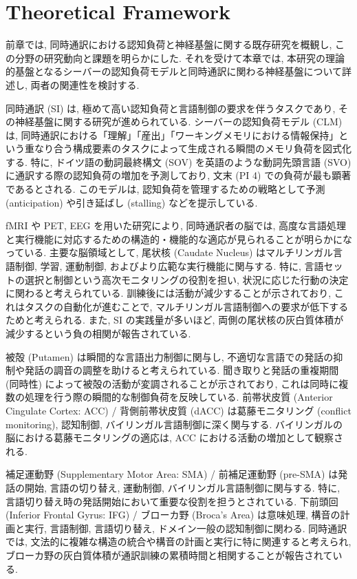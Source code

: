 \section{Theoretical Framework}

前章では, 同時通訳における認知負荷と神経基盤に関する既存研究を概観し, この分野の研究動向と課題を明らかにした.
それを受けて本章では, 本研究の理論的基盤となるシーバーの認知負荷モデルと同時通訳に関わる神経基盤について詳述し, 両者の関連性を検討する.

同時通訳 (SI) は, 極めて高い認知負荷と言語制御の要求を伴うタスクであり, その神経基盤に関する研究が進められている.
シーバーの認知負荷モデル (CLM) は, 同時通訳における「理解」「産出」「ワーキングメモリにおける情報保持」という重なり合う構成要素のタスクによって生成される瞬間のメモリ負荷を図式化する.
特に, ドイツ語の動詞最終構文 (SOV) を英語のような動詞先頭言語 (SVO) に通訳する際の認知負荷の増加を予測しており, 文末 (PI 4) での負荷が最も顕著であるとされる.
このモデルは, 認知負荷を管理するための戦略として予測 (anticipation) や引き延ばし (stalling) などを提示している.

fMRI や PET, EEG を用いた研究により, 同時通訳者の脳では, 高度な言語処理と実行機能に対応するための構造的・機能的な適応が見られることが明らかになっている.
主要な脳領域として, 尾状核 (Caudate Nucleus) はマルチリンガル言語制御, 学習, 運動制御, およびより広範な実行機能に関与する.
特に, 言語セットの選択と制御という高次モニタリングの役割を担い, 状況に応じた行動の決定に関わると考えられている.
訓練後には活動が減少することが示されており, これはタスクの自動化が進むことで, マルチリンガル言語制御への要求が低下するためと考えられる.
また, SI の実践量が多いほど, 両側の尾状核の灰白質体積が減少するという負の相関が報告されている.

被殻 (Putamen) は瞬間的な言語出力制御に関与し, 不適切な言語での発話の抑制や発話の調音の調整を助けると考えられている.
聞き取りと発話の重複期間 (同時性) によって被殻の活動が変調されることが示されており, これは同時に複数の処理を行う際の瞬間的な制御負荷を反映している.
前帯状皮質 (Anterior Cingulate Cortex: ACC) / 背側前帯状皮質 (dACC) は葛藤モニタリング (conflict monitoring), 認知制御, バイリンガル言語制御に深く関与する.
バイリンガルの脳における葛藤モニタリングの適応は, ACC における活動の増加として観察される.

補足運動野 (Supplementary Motor Area: SMA) / 前補足運動野 (pre-SMA) は発話の開始, 言語の切り替え, 運動制御, バイリンガル言語制御に関与する.
特に, 言語切り替え時の発話開始において重要な役割を担うとされている.
下前頭回 (Inferior Frontal Gyrus: IFG) / ブローカ野 (Broca's Area) は意味処理, 構音の計画と実行, 言語制御, 言語切り替え, ドメイン一般の認知制御に関わる.
同時通訳では, 文法的に複雑な構造の統合や構音の計画と実行に特に関連すると考えられ, ブローカ野の灰白質体積が通訳訓練の累積時間と相関することが報告されている.

